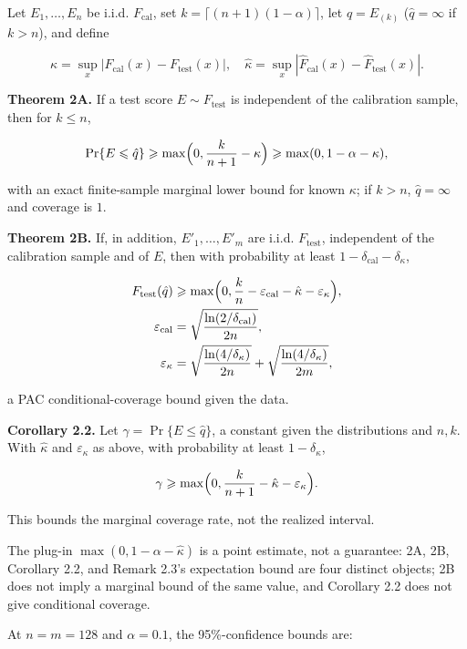 Let $E_1,\dots,E_n$ be i.i.d. $F_{\mathrm{cal}}$, set $k=\lceil(n+1)(1-\alpha)\rceil$, let $\hat q=E_{(k)}$ ($\hat q=\infty$ if $k>n$), and define

\[
\kappa=\sup_x|F_{\mathrm{cal}}(x)-F_{\mathrm{test}}(x)|,
\quad
\hat\kappa=\sup_x|\hat F_{\mathrm{cal}}(x)-\hat F_{\mathrm{test}}(x)|.
\]

\textbf{Theorem 2A.} If a test score $E\sim F_{\mathrm{test}}$ is independent of the calibration sample, then for $k\le n$,

\[
\Pr\{E\le\hat q\}\ge\max\Bigl(0,\frac{k}{n+1}-\kappa\Bigr)\ge\max(0,1-\alpha-\kappa),
\]

with an exact finite-sample marginal lower bound for known $\kappa$; if $k>n$, $\hat q=\infty$ and coverage is $1$.

\textbf{Theorem 2B.} If, in addition, $E'_1,\dots,E'_m$ are i.i.d. $F_{\mathrm{test}}$, independent of the calibration sample and of $E$, then with probability at least $1-\delta_{\mathrm{cal}}-\delta_\kappa$,

\[
\begin{aligned}
F_{\mathrm{test}}(\hat q)&\ge\max\Bigl(0,\frac{k}{n}-\varepsilon_{\mathrm{cal}}-\hat\kappa-\varepsilon_\kappa\Bigr),\\
\varepsilon_{\mathrm{cal}}&=\sqrt{\frac{\ln(2/\delta_{\mathrm{cal}})}{2n}},\\
\varepsilon_\kappa&=\sqrt{\frac{\ln(4/\delta_\kappa)}{2n}}+\sqrt{\frac{\ln(4/\delta_\kappa)}{2m}},
\end{aligned}
\]

a PAC conditional-coverage bound given the data.

\textbf{Corollary 2.2.} Let $\gamma=\Pr\{E\le\hat q\}$, a constant given the distributions and $n,k$. With $\hat\kappa$ and $\varepsilon_\kappa$ as above, with probability at least $1-\delta_\kappa$,

\[
\gamma\ge\max\Bigl(0,\frac{k}{n+1}-\hat\kappa-\varepsilon_\kappa\Bigr).
\]

This bounds the marginal coverage rate, not the realized interval.

The plug-in $\max(0,1-\alpha-\hat\kappa)$ is a point estimate, not a guarantee: 2A, 2B, Corollary 2.2, and Remark 2.3's expectation bound are four distinct objects; 2B does not imply a marginal bound of the same value, and Corollary 2.2 does not give conditional coverage.

At $n=m=128$ and $\alpha=0.1$, the 95\%-confidence bounds are:

